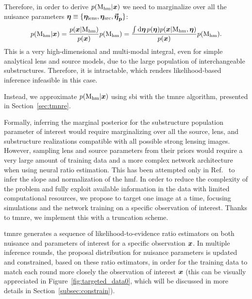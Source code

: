 Therefore, in order to derive $p(\mathrm{M_{hm}}|\bm{x})$ we need to marginalize over all the nuisance parameters $\bm{\eta}\equiv\{\bm{\eta}_\mathrm{lens}, \bm{\eta}_\mathrm{src}, \boldsymbol{\vec{{\bm{\eta}}}_\mathrm{p}}\}$:
\begin{equation}\label{eq:post}
     p(\mathrm{M_{hm}}|\bm{x}) = 
     \frac{p(\bm{x}|\mathrm{M_{hm}})}{p(\bm{x})} p(\mathrm{M_{hm}}) =
     \frac{\int \dd{\ensuremath{\bm{\eta}}} p(\bm{\eta}) p(\bm{x}|\mathrm{M_{hm}}, \bm{\eta})}{p(\bm{x})} p(\mathrm{M_{hm}}).
\end{equation}
This is a very high-dimensional and multi-modal integral, even for simple analytical lens and source models, due to the large population of interchangeable substructures. Therefore, it is intractable, which renders likelihood-based inference infeasible in this case.

Instead, we approximate $p(\mathrm{M_{hm}}|\bm{x})$ using \gls*{sbi} with the \gls*{tmnre} algorithm, presented in Section~\ref{sec:tmnre}.


Formally, inferring the marginal posterior for the substructure population parameter of interest would require marginalizing over all the source, lens, and substructure realizations compatible with all possible strong lensing images. However, sampling lens and source parameters from their priors would require a very large amount of training data and a more complex network architecture when using neural ratio estimation. This has been attempted only in Ref.~\cite{Brehmer:2019jyt} to infer the slope and normalization of the \gls*{hmf}. In order to reduce the complexity of the problem and fully exploit available information in the data with limited computational resources, we propose to target one image at a time, focusing simulations and the network training on a specific observation of interest. Thanks to \gls*{tmnre}, we implement this with a truncation scheme.

\gls*{tmnre} generates a sequence of likelihood-to-evidence ratio estimators on both nuisance and parameters of interest for a specific observation $\bm{x}$. In multiple inference rounds, the proposal distribution for nuisance parameters is updated and constrained, based on these ratio estimators, in order for the training data to match each round more closely the observation of interest $\bm{x}$ (this can be visually appreciated in Figure~\ref{fig:targeted_data0}, which will be discussed in more details in Section~\ref{subsec:constrain}). 

